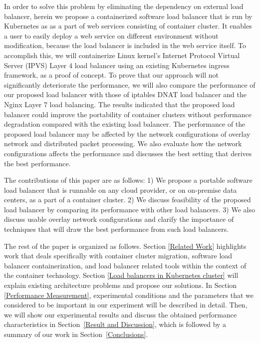 In order to solve this problem by eliminating the dependency on external load balancer,
herein we propose a containerized software load balancer that is run by Kubernetes as  
as a part of web services consisting of container cluster.
It enables a user to easily deploy a web service on different environment without modification, 
because the load balancer is included in the web service itself. 
To accomplish this, we will containerize Linux kernel's Internet Protocol Virtual Server (IPVS)\cite{Zhang2000} 
Layer 4 load balancer using an existing Kubernetes ingress\cite{K8sIngress2017} framework, as a proof of concept.
%
%
To prove that our approach will not significantly deteriorate the performance,  
we will also compare the performance of our proposed load balancer with those of 
iptables DNAT load balancer and the Nginx Layer 7 load balancing. 
%
The results indicated that the proposed load balancer could improve the portability of container clusters 
without performance degradation compared with the existing load balancer.
The performance of the proposed load balancer may be affected by the network configurations of overlay network 
and distributed packet processing. 
We also evaluate how the network configurations affects the performance and discusses 
the best setting that derives the best performance.

The contributions of this paper are as follows: 
1) We propose a portable software load balancer that is runnable on any cloud provider, or on on-premise data centers, 
as a part of a container cluster.
2) We discuss feasibility of the proposed load balancer by comparing its performance with other load balancers.
3) We also discuss usable overlay network configurations and clarify the importance of techniques 
that will  draw the best performance from such load balancers.  

The rest of the paper is organized as follows.
Section \ref{Related Work} highlights work that deals specifically with container cluster migration, 
software load balancer containerization, and load balancer related tools within the context of the container technology. 
Section \ref{Load balancers in Kubernetes cluster} will explain existing architecture problems and propose our solutions.
In Section \ref{Performance Measurement}, experimental conditions and the parameters 
that we considered to be important in our experiment will be described in detail.
Then, we will show our experimental results and discuss the obtained performance characteristics in Section~\ref{Result and Discussion},  
which is followed by a summary of our work in Section~\ref{Conclusions}.

